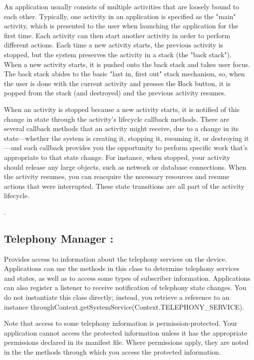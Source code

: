 \documentclass[12pt,a4paper]{report}
\begin{document}
An application usually consists of multiple activities that are loosely bound to each other. Typically, one activity in an application is specified as the "main" activity, which is presented to the user when launching the application for the first time. Each activity can then start another activity in order to perform different actions. Each time a new activity starts, the previous activity is stopped, but the system preserves the activity in a stack (the "back stack"). When a new activity starts, it is pushed onto the back stack and takes user focus. The back stack abides to the basic "last in, first out" stack mechanism, so, when the user is done with the current activity and presses the Back button, it is popped from the stack (and destroyed) and the previous activity resumes. 

When an activity is stopped because a new activity starts, it is notified of this change in state through the activity's lifecycle callback methods. There are several callback methods that an activity might receive, due to a change in its state—whether the system is creating it, stopping it, resuming it, or destroying it—and each callback provides you the opportunity to perform specific work that's appropriate to that state change. For instance, when stopped, your activity should release any large objects, such as network or database connections. When the activity resumes, you can reacquire the necessary resources and resume actions that were interrupted. These state transitions are all part of the activity lifecycle.

.

\subsection{Telephony Manager :}
Provides access to information about the telephony services on the device. Applications can use the methods in this class to determine telephony services and states, as well as to access some types of subscriber information. Applications can also register a listener to receive notification of telephony state changes.
You do not instantiate this class directly; instead, you retrieve a reference to an instance throughContext.getSystemService(Context.TELEPHONY\_SERVICE).

Note that access to some telephony information is permission-protected. Your application cannot access the protected information unless it has the appropriate permissions declared in its manifest file. Where permissions apply, they are noted in the the methods through which you access the protected information.
\end{document}
